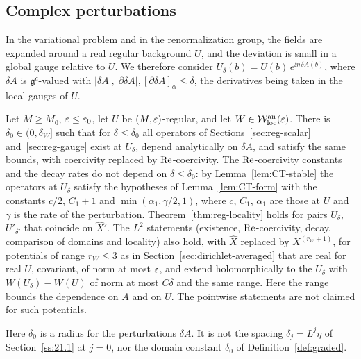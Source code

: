 \subsection{Complex perturbations}\label{subsec:reg-complex}

In the variational problem and in the renormalization group, the fields are expanded around a real regular background $U$, and the deviation is small in a global gauge relative to $U$. We therefore consider $U_\delta(b)=U(b)\,e^{\ii\eta\,\delta\!A(b)}$, where $\delta\!A$ is $\mathfrak g^c$-valued with $|\delta\!A|,|\partial\delta\!A|,[\partial\delta\!A]_\alpha\le\delta$, the derivatives being taken in the local gauges of $U$.

\begin{proposition}\label{prop:reg-complex}
Let $M\ge M_0$, $\varepsilon\le\varepsilon_0$, let $U$ be $(M,\varepsilon)$-regular, and let $W\in\mathcal W^{\rm an}_{\rm loc}(\varepsilon)$. There is $\delta_0\in(0,\delta_W]$ such that for $\delta\le\delta_0$ all operators of Sections~\ref{sec:reg-scalar} and~\ref{sec:reg-gauge} exist at $U_\delta$, depend analytically on $\delta\!A$, and satisfy the same bounds, with coercivity replaced by $\operatorname{Re}$-coercivity. The $\operatorname{Re}$-coercivity constants and the decay rates do not depend on $\delta\le\delta_0$: by Lemma~\ref{lem:CT-stable} the operators at $U_\delta$ satisfy the hypotheses of Lemma~\ref{lem:CT-form} with the constants $c/2$, $C_1+1$ and $\min(\alpha_1,\gamma/2,1)$, where $c$, $C_1$, $\alpha_1$ are those at $U$ and $\gamma$ is the rate of the perturbation. Theorem~\ref{thm:reg-locality} holds for pairs $U_\delta$, $U'_{\delta'}$ that coincide on $\hat X'$.
 The $L^2$ statements (existence, $\operatorname{Re}$-coercivity, decay, comparison of domains and locality) also hold, with $\hat X$ replaced by $X^{(r_W+1)}$, for potentials of range $r_W\le3$ as in Section~\ref{sec:dirichlet-averaged} that are real for real $U$, covariant, of norm at most $\varepsilon$, and extend holomorphically to the $U_\delta$ with $W(U_\delta)-W(U)$ of norm at most $C\delta$ and the same range. Here the range bounds the dependence on $A$ and on $U$. The pointwise statements are not claimed for such potentials.
\end{proposition}

Here $\delta_0$ is a radius for the perturbations $\delta\!A$. It is not the spacing $\delta_j=L^j\eta$ of Section~\ref{ss:21.1} at $j=0$, nor the domain constant $\delta_0$ of Definition~\ref{def:graded}.

